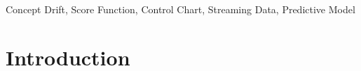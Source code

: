 \documentclass[twoside,11pt]{article}
\begin{document}

\begin{keywords} 	
  Concept Drift, Score Function, Control Chart, Streaming Data, Predictive Model
\end{keywords}

\section{Introduction}
\end{document}
